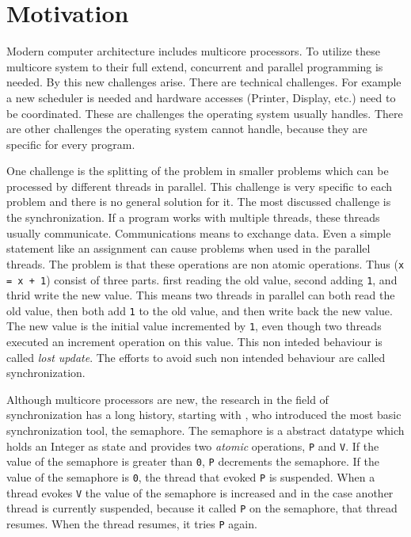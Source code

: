 
\chapter{Motivation} %

\label{Chapter0} %


\newcommand{\keyword}[1]{\textit{#1}}
\newcommand{\tabhead}[1]{\textbf{#1}}
\newcommand{\code}[1]{\texttt{#1}}
\newcommand{\file}[1]{\texttt{\bfseries#1}}
\newcommand{\option}[1]{\texttt{\itshape#1}}

Modern computer architecture includes multicore processors. To utilize these multicore system to their full extend, concurrent and parallel programming is needed.
By this new challenges arise. There are technical challenges. For example a new scheduler is needed and hardware accesses (Printer, Display, etc.) need to be 
coordinated. These are challenges the operating system usually handles. There are other challenges the operating system cannot handle, because they are specific 
for every program.

One challenge is the splitting of the problem in smaller problems which can be processed by different threads in parallel. This challenge is very specific
to each problem and there is no general solution for it. 
The most discussed challenge is the synchronization. If a program works with multiple threads, these threads usually communicate. Communications means to 
exchange data. Even a simple statement like an assignment can cause problems when used in the parallel threads. The problem is that these operations are
non atomic operations. Thus (\code{x = x + 1}) consist of three parts. first reading the old value, second adding \code{1}, and thrid write the new value.
This means two threads in parallel can both read the old value, then both add \code{1} to the old value, and then write back the new value. 
The new value is the initial value incremented by \code{1}, even though two threads executed an increment operation on this value. 
This non inteded behaviour is called \keyword{lost update}. The efforts to avoid such non intended behaviour are called synchronization.

Although multicore processors are new, the research in the field of synchronization has a long history, starting with \parencite{semaphore}, who
introduced the most basic synchronization tool, the semaphore. The semaphore is a abstract datatype which holds an Integer as state and provides two 
\keyword{atomic} operations, \code{P} and \code{V}. If the value of the semaphore is greater than \code{0}, \code{P} decrements the semaphore. If the value of 
the semaphore is \code{0}, the thread that evoked \code{P} is suspended. When a thread evokes \code{V} the value of the semaphore is increased and
in the case another thread is currently suspended, because it called \code{P} on the semaphore, that thread resumes. When the thread 
resumes, it tries \code{P} again. 

